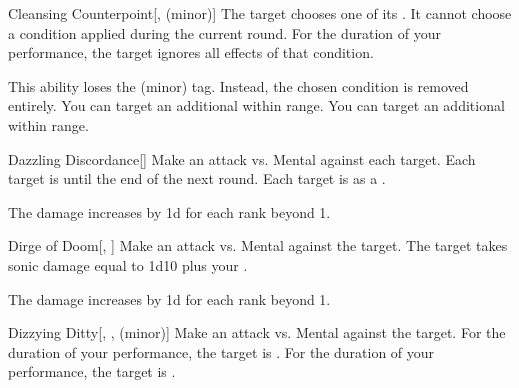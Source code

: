 {            \begin{freeability}{Cleansing Counterpoint}[,  (minor)]
                The target chooses one of its .
                It cannot choose a condition applied during the current round.
                For the duration of your performance, the target ignores all effects of that condition.

                \rankline
                 This ability loses the  (minor) tag.
                    Instead, the chosen condition is removed entirely.
                 You can target an additional  within range.
                 You can target an additional  within range.
            \end{freeability}

            \begin{freeability}{Dazzling Discordance}[]
                Make an attack vs. Mental against each target.
                \hit Each target is  until the end of the next round.
                \crit Each target is  as a .

                \rankline
                The damage increases by \plus1d for each rank beyond 1.
            \end{freeability}

            \begin{freeability}{Dirge of Doom}[, ]
                Make an attack vs. Mental against the target.
                \hit The target takes sonic damage equal to 1d10 plus your .

                \rankline
                The damage increases by \plus1d for each rank beyond 1.
            \end{freeability}

            \begin{freeability}{Dizzying Ditty}[, ,  (minor)]
                Make an attack vs. Mental against the target.
                \hit For the duration of your performance, the target is .
                \crit For the duration of your performance, the target is .


\end{freeability}}
